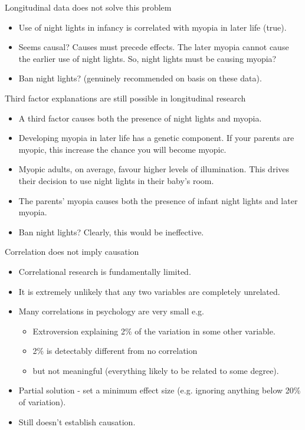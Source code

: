 \documentclass{beamer}
\begin{document}
\begin{frame}{Longitudinal data does not solve this problem}
\begin{itemize}
\item Use of night lights in infancy is correlated with myopia in later life (true).
\vspace{12 pt}
\item Seems causal? Causes must precede effects. The later myopia cannot cause the earlier use of night lights.
So, night lights must be causing myopia?

\item Ban night lights? (genuinely recommended on basis on these data).
\end{itemize}
\end{frame}

\begin{frame}{Third factor explanations are still possible in longitudinal research}
\begin{itemize}
\item A third factor causes both the presence of night lights and myopia.
\item Developing myopia in later life has a genetic component. If your parents are myopic, this increase the chance you will become myopic.
\item Myopic adults, on average, favour higher levels of illumination. This drives their decision to use night lights in their baby's room. 
\item The parents' myopia causes both the presence of infant night lights and later myopia.
\item Ban night lights? Clearly, this would be ineffective.
\end{itemize}
\end{frame}

\begin{frame}{Correlation does not imply causation}
\begin{itemize}
\item Correlational research is fundamentally limited.
\item It is extremely unlikely that any two variables are completely unrelated.
\item Many correlations in psychology are very small e.g.
\begin{itemize}
\item Extroversion explaining 2\% of the variation in some other variable.
\item 2\% is detectably different from no correlation
\item but not meaningful (everything likely to be related to some degree).
\end{itemize}
\item Partial solution - set a minimum effect size (e.g. ignoring anything below 20\% of variation).
\item Still doesn't establish causation.
\end{itemize}
\end{frame}
\end{document}
